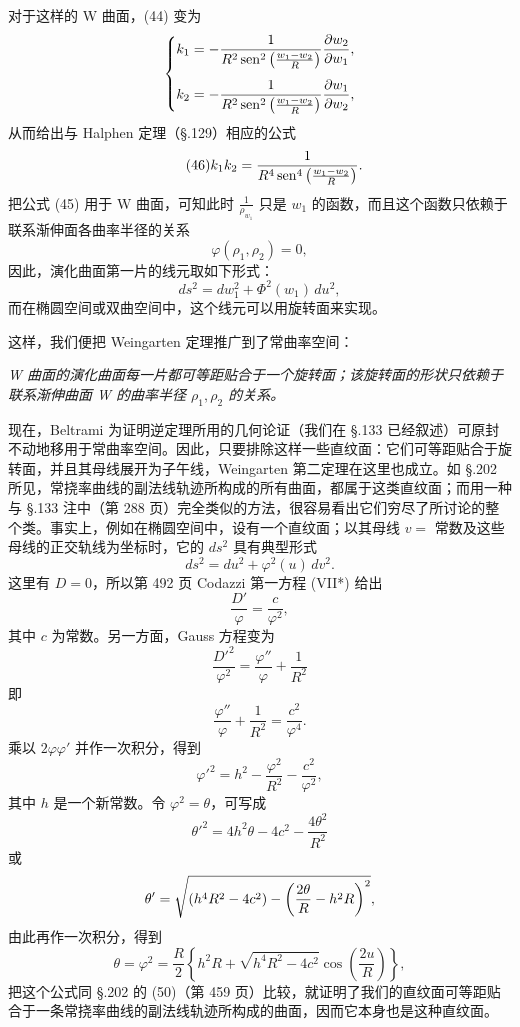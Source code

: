 对于这样的 W 曲面，(44) 变为
\[
\left\{
\begin{aligned}
k_1&=-\frac1{R^2\operatorname{sen}^2\left(\frac{w_1-w_2}{R}\right)}\frac{\partial w_2}{\partial w_1},\\[0.4em]
k_2&=-\frac1{R^2\operatorname{sen}^2\left(\frac{w_1-w_2}{R}\right)}\frac{\partial w_1}{\partial w_2},
\end{aligned}\right.
\]
从而给出与 Halphen 定理（\S.129）相应的公式
\[
\tag{46}
k_1k_2=\frac1{R^4\operatorname{sen}^4\left(\frac{w_1-w_2}{R}\right)}.
\]
把公式 (45) 用于 W 曲面，可知此时 $\frac1{\rho_{w_1}}$ 只是 $w_1$ 的函数，而且这个函数只依赖于联系渐伸面各曲率半径的关系
\[
\varphi(\rho_1,\rho_2)=0,
\]
因此，演化曲面第一片的线元取如下形式：
\[
ds^2=dw_1^2+\Phi^2(w_1)\,du^2,
\]
而在椭圆空间或双曲空间中，这个线元可以用旋转面来实现。

这样，我们便把 Weingarten 定理推广到了常曲率空间：

\emph{W 曲面的演化曲面每一片都可等距贴合于一个旋转面；该旋转面的形状只依赖于联系渐伸曲面 W 的曲率半径 $\rho_1,\rho_2$ 的关系。}

现在，Beltrami 为证明逆定理所用的几何论证（我们在 \S.133 已经叙述）可原封不动地移用于常曲率空间。因此，只要排除这样一些直纹面：它们可等距贴合于旋转面，并且其母线展开为子午线，Weingarten 第二定理在这里也成立。如 \S.202 所见，常挠率曲线的副法线轨迹所构成的所有曲面，都属于这类直纹面；而用一种与 \S.133 注中（第 288 页）完全类似的方法，很容易看出它们穷尽了所讨论的整个类。事实上，例如在椭圆空间中，设有一个直纹面；以其母线 $v=$ 常数及这些母线的正交轨线为坐标时，它的 $ds^2$ 具有典型形式
\[
ds^2=du^2+\varphi^2(u)\,dv^2.
\]
这里有 $D=0$，所以第 492 页 Codazzi 第一方程 (VII*) 给出
\[
\frac{D'}{\varphi}=\frac{c}{\varphi^2},
\]
其中 $c$ 为常数。另一方面，Gauss 方程变为
\[
\frac{D'^2}{\varphi^2}=\frac{\varphi''}{\varphi}+\frac1{R^2}
\]
即
\[
\frac{\varphi''}{\varphi}+\frac1{R^2}=\frac{c^2}{\varphi^4}.
\]
乘以 $2\varphi\varphi'$ 并作一次积分，得到
\[
\varphi'^2=h^2-\frac{\varphi^2}{R^2}-\frac{c^2}{\varphi^2},
\]
其中 $h$ 是一个新常数。令 $\varphi^2=\theta$，可写成
\[
\theta'^2=4h^2\theta-4c^2-\frac{4\theta^2}{R^2}
\]
或
\[
\theta'=\sqrt{(h^4R^2-4c^2)-\left(\frac{2\theta}{R}-h^2R\right)^2},
\]
由此再作一次积分，得到
\[
\theta=\varphi^2=\frac R2\left\{h^2R+\sqrt{h^4R^2-4c^2}\cos\left(\frac{2u}{R}\right)\right\},
\]
把这个公式同 \S.202 的 (50)（第 459 页）比较，就证明了我们的直纹面可等距贴合于一条常挠率曲线的副法线轨迹所构成的曲面，因而它本身也是这种直纹面。

